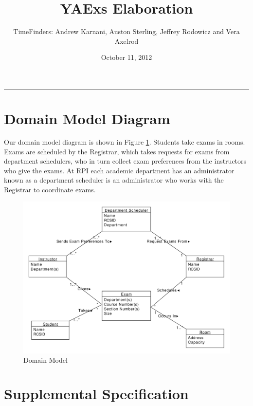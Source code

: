 \documentclass[11pt]{article}
\title{YAExs Elaboration}
\author{TimeFinders: Andrew Karnani, Auston Sterling, Jeffrey Rodowicz and Vera Axelrod}
\date{October 11, 2012}
\begin{document}
\maketitle
\tableofcontents
\vspace{0.2in}
\hrule
\vspace{1in}

\section{Domain Model Diagram} %
Our domain model diagram is shown in Figure \ref{fig:Domain}.  Students take exams in rooms. Exams are scheduled by the Registrar, which takes requests for exams from department schedulers, who in turn collect exam preferences from the instructors who give the exams. At RPI each academic department has an administrator known as a  department scheduler is an administrator who works with the Registrar to coordinate exams.
\begin{figure}
	\centering
		\includegraphics[width = \textwidth]{domainDiagram.pdf}
	\caption{Domain Model}
	\label{fig:Domain}
\end{figure}

\section{Supplemental Specification} %
\end{document}
